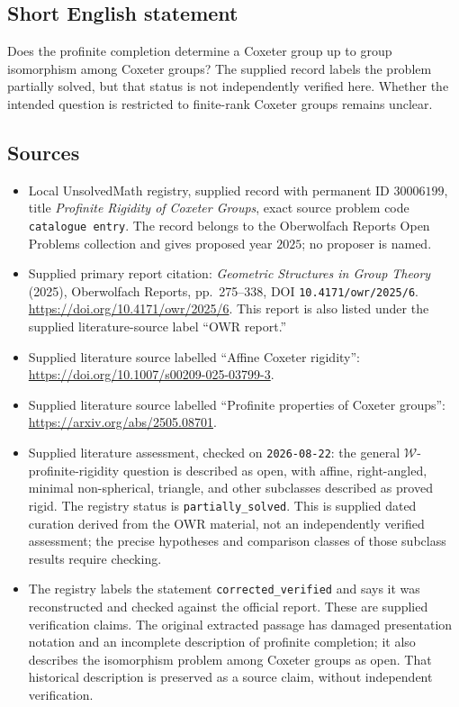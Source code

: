 \documentclass[11pt]{article}
\begin{document}
\subsection{Short English statement}
Does the profinite completion determine a Coxeter group up to group isomorphism among Coxeter groups? The supplied record labels the problem partially solved, but that status is not independently verified here. Whether the intended question is restricted to finite-rank Coxeter groups remains unclear.
\subsection{Sources}
\begin{itemize}
\item Local UnsolvedMath registry, supplied record with permanent ID \(30006199\), title \emph{Profinite Rigidity of Coxeter Groups}, exact source problem code \texttt{catalogue entry}. The record belongs to the Oberwolfach Reports Open Problems collection and gives proposed year \(2025\); no proposer is named.
\item Supplied primary report citation: \emph{Geometric Structures in Group Theory} (2025), Oberwolfach Reports, pp.\ 275--338, DOI \texttt{10.4171/owr/2025/6}. \url{https://doi.org/10.4171/owr/2025/6}. This report is also listed under the supplied literature-source label ``OWR report.''
\item Supplied literature source labelled ``Affine Coxeter rigidity'': \url{https://doi.org/10.1007/s00209-025-03799-3}.
\item Supplied literature source labelled ``Profinite properties of Coxeter groups'': \url{https://arxiv.org/abs/2505.08701}.
\item Supplied literature assessment, checked on \texttt{2026-08-22}: the general \(\mathcal W\)-profinite-rigidity question is described as open, with affine, right-angled, minimal non-spherical, triangle, and other subclasses described as proved rigid. The registry status is \texttt{partially\_solved}. This is supplied dated curation derived from the OWR material, not an independently verified assessment; the precise hypotheses and comparison classes of those subclass results require checking.
\item The registry labels the statement \texttt{corrected\_verified} and says it was reconstructed and checked against the official report. These are supplied verification claims. The original extracted passage has damaged presentation notation and an incomplete description of profinite completion; it also describes the isomorphism problem among Coxeter groups as open. That historical description is preserved as a source claim, without independent verification.
\end{itemize}
\end{document}
